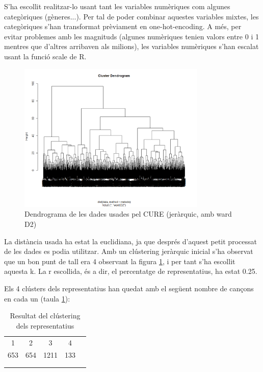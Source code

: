 \documentclass{article}
\begin{document}
S’ha escollit realitzar-lo usant tant les variables numèriques com algunes categòriques (gèneres...). Per tal de poder combinar aquestes variables mixtes, les categòriques s’han transformat prèviament en one-hot-encoding. A més, per evitar problemes amb les magnituds (algunes numèriques tenien valors entre 0 i 1 mentres que d’altres arribaven als milions), les variables numèriques s’han escalat usant la funció scale de R.

\begin{figure}[H]
    \centering
    \includegraphics[width=0.8\textwidth]{Images/4_clustering/CURE/curedendrogram.png}
    \caption{Dendrograma de les dades usades pel CURE (jeràrquic, amb ward D2)}
    \label{fig:CURE_dend}
\end{figure}

La distància usada ha estat la euclidiana, ja que després d’aquest petit processat de les dades es podia utilitzar. Amb un  clústering jeràrquic inicial s’ha observat que un bon punt de tall era 4 observant la figura \ref{fig:CURE_dend}, i per tant s’ha escollit aquesta k. La r escollida, és a dir, el percentatge de representatius, ha estat 0.25.

Els 4 clústers dels representatius han quedat amb el següent nombre de cançons en cada un (taula \ref{tab:CURE_taularep}):

\begin{table}[H]
\centering
\begin{tabular}{lllll}
\cline{1-4}
\multicolumn{1}{|c|}{1}   & \multicolumn{1}{c|}{2}   & \multicolumn{1}{c|}{3}    & \multicolumn{1}{c|}{4}   &  \\ \cline{1-4}
\multicolumn{1}{|c|}{653} & \multicolumn{1}{c|}{654} & \multicolumn{1}{c|}{1211} & \multicolumn{1}{c|}{133} &  \\ \cline{1-4}
                          &                          &                           &                          &  \\
                          &                          &                           &                          & 
\end{tabular}
\caption{Resultat del clústering dels representatius}
\label{tab:CURE_taularep}
\end{table}
\end{document}
